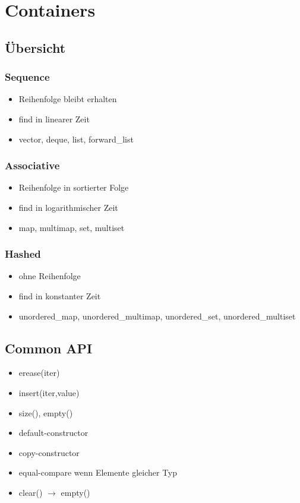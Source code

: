 \section{Containers}
\subsection{Übersicht}
\subsubsection{Sequence}
\begin{itemize}
	\item Reihenfolge bleibt erhalten
	\item find  in linearer Zeit
	\item vector, deque, list, forward\_list
\end{itemize}
\subsubsection{Associative}
\begin{itemize}
	\item Reihenfolge in sortierter Folge
	\item find  in logarithmischer Zeit
	\item map, multimap, set, multiset
\end{itemize}
\subsubsection{Hashed}
\begin{itemize}
	\item ohne Reihenfolge
	\item find  in konstanter Zeit
	\item unordered\_map, unordered\_multimap, \newline
		unordered\_set, unordered\_multiset
\end{itemize}
\subsection{Common API}
\begin{itemize}
	\item erease(iter)
	\item insert(iter,value)
	\item size(), empty()
	\item default-constructor
	\item copy-constructor
	\item equal-compare wenn Elemente gleicher Typ
	\item clear() $\rightarrow$ empty()
\end{itemize}
